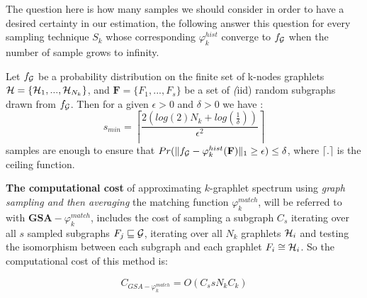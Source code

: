 The question here is how many samples we should consider in order to have a desired certainty in our estimation, the following answer this question for every sampling technique $S_k$ whose corresponding $\varphi_k^{hist}$ converge to $f_{\mathcal{G}}$ when the number of sample grows to infinity.
\begin{theorem}
Let $f_{\mathcal{G}}$ be a probability distribution on the finite set of k-nodes graphlets  $\mathcal{H}=\{\mathcal{H}_1,...,\mathcal{H}_{N_k}\}$, and $\mathbf{F}=\{F_1,...,F_{s}\}$ be a set of \emph(iid) random subgraphs drawn from $f_{\mathcal{G}}$. Then for a given $\epsilon>0$ and $\delta >0$ we have \citep{graphlet_kernel}:
\begin{equation}
s_{min}=\left \lceil \frac{2(log(2)N_k+log(\frac{1}{\delta} ))}{\epsilon^2} \right \rceil
\end{equation}
samples are enough to ensure that $Pr(\| f_{\mathcal{G}}-\varphi_k^{hist}(\mathbf{F}) \|_1 \geq \epsilon )\leq\delta$, where $\lceil.\rceil$ is the ceiling function.
\end{theorem}

\textbf{The computational cost} of approximating $k$-graphlet spectrum using \emph{ graph sampling and then averaging} the matching function $\varphi_k^{match}$, will be referred to with $\mathbf{GSA}-{\varphi_k^{match}}$, includes the cost of sampling a subgraph $C_s$ iterating over all $s$ sampled subgraphs $F_j\sqsubseteq \mathcal{G}$, iterating over all $N_k$ graphlets $\mathcal{H}_i$ and testing the isomorphism between each subgraph and each graphlet $F_i\cong \mathcal{H}_i$. So the computational cost of this method is:

\begin{equation}
\label{eq:cost_graphlet_sampling}
    C_{GSA-{\varphi_k^{match}}}= O(C_s s N_k C_k)
\end{equation}



